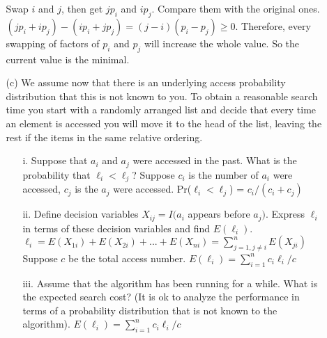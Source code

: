 \documentclass{article}       %
\begin{document}
\begin{enumerate}
\begin{enumerate}
		Swap $i$ and $j$, then get $jp_i$ and $ip_j$. Compare them with the original ones. $(jp_i+ip_j)-(ip_i+jp_j) = (j-i)(p_i-p_j) \geq 0$.\newline
		Therefore, every swapping of factors of $p_i$ and $p_j$ will increase the whole value. So the current value is the minimal.\newline
		\item[(c)] We assume now that there is an underlying access probability distribution that this is not known to you. To obtain a reasonable search time you start with a randomly arranged list and decide that every time an element is accessed you will move it to the head of the list, leaving the rest if the items in the same relative ordering.
		\begin{enumerate}
			\item[i.] Suppose that $a_i$ and $a_j$ were accessed in the past. What is the probability that ${\ell}_i < {\ell}_j$?\newline\newline
			Suppose $c_i$ is the number of $a_i$ were accessed, $c_j$ is the $a_j$ were accessed.\newline
			Pr(${\ell}_i < {\ell}_j$) = $c_i/(c_i+c_j)$\newline
			\item[ii.] Define decision variables $X_{ij} = I(a_i$ appears before $a_j)$. Express ${\ell}_i$ in terms of these decision variables and find $E({\ell}_i)$.\newline\newline
			${\ell}_i = E(X_{1i}) + E(X_{2i}) + ... + E(X_{ni}) = \sum_{j=1,j\neq i}^{n} E(X_{ji})$\newline
			Suppose $c$ be the total access number.\newline
			$E({\ell}_i) = \sum_{i=1}^{n} c_i{\ell}_i/c$\newline
			\item[iii.] Assume that the algorithm has been running for a while. What is the expected search cost? (It is ok to analyze the performance in terms of a probability distribution that is not known to the algorithm).\newline\newline
			$E({\ell}_i) = \sum_{i=1}^{n} c_i{\ell}_i/c$\newline
			

\end{enumerate}
\end{enumerate}
\end{enumerate}
\end{document}
